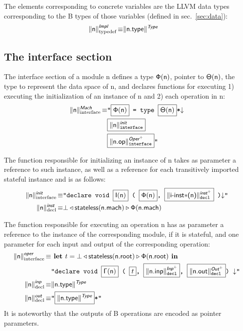 \documentclass{llncs}
\newcommand{\trad}[2]{\ensuremath{\lVert \textsf{#1} \rVert^{\textit{#2}}}}
\newcommand{\nl}[0]{\ensuremath{\downarrow}}
\DeclareMathOperator{\isdef}{\equiv}
\newcommand{\llvm}[1]{\texttt{#1}}
\newcommand{\B}[1]{\textsf{#1}}
\newcommand{\ListOf}[1]{$\mbox{#1}^+$}
\newcommand{\LET}[0]{\textbf{ let }}
\newcommand{\IN}[0]{\textbf{ in }}
\newcommand{\PH}[1]{\framebox{$#1$}}
\newcommand{\Global}[0]{\ensuremath{\sf\Gamma}}
\newcommand{\stateless}[0]{\ensuremath{\textsf{stateless}}}
\newcommand{\trimportedinstances}[0]{\ensuremath{\textsf{i-inst$\mathsf{\ast}$}}}
\newcommand{\state}[0]{\ensuremath{\sf\Theta}}
\newcommand{\stateref}[0]{\ensuremath{\sf\Phi}}
\newcommand{\init}[0]{\ensuremath{\mathsf{I}}}
\begin{document}
The elements corresponding to concrete variables are the LLVM data types
corresponding to the B types of those variables (defined in
sec.~\ref{sec:data}):
\begin{align*}
  \trad{\B{n}}{\B{Impl}}_{\text{typedef}} \isdef
  & \trad{\B{n.type}}{\B{Type}}
\end{align*}

\subsection{The interface section}

The interface section of a module \B{n} defines a type $\stateref(\B{n})$,
pointer to $\state(\B{n})$, the type to represent the data space of \B{n}, and
declares functions for executing 1) executing the initialization of an instance
of \B{n} and 2) each operation in \B{n}:
\begin{align*}
  \trad{\B{n}}{\B{Mach}}_{\text{interface}} \isdef
  & \llvm{"\PH{\stateref(\B{n})} = type \PH{\state(\B{n})}*\nl} \\
  & \llvm{\PH{\trad{\B{n}}{\B{init}}_{\text{interface}}}}\\
  & \llvm{\PH{\trad{\B{n.op}}{\ListOf{\B{Oper}}}_{\text{interface}}}"}
\end{align*}

The function responsible for initializing an instance of \B{n} takes as
parameter a reference to such instance, as well as a reference for each
transitively imported stateful instance and is as follows:
\begin{align*}
  \trad{\B{n}}{\B{init}}_{\text{interface}} \isdef
  & \llvm{"declare void \PH{\init(\B{n})} ( \PH{\stateref(\B{n})},
    \PH{\trad{\trimportedinstances(\B{n})}{\ListOf{\B{inst}}}_{\text{decl}}} )\nl"} \\
  \trad{\B{n}}{\B{inst}}_{\text{decl}} \isdef
  & \bot \triangleleft \stateless(\B{n.mach}) \triangleright \stateref(\B{n.mach})
\end{align*}

The function responsible for executing an operation \B{n} has as parameter a
reference to the instance of the corresponding module, if it is stateful, and
one parameter for each input and output of the corresponding operation:
\begin{align*}
  \trad{\B{n}}{\B{oper}}_{\text{interface}} \isdef
  &
\LET t = \bot \triangleleft \stateless(\B{n.root}) \triangleright \stateref(\B{n.root}) \IN \\
& \llvm{"declare void \PH{\Global(\B{n})}
( \PH{t},
  \PH{\trad{\B{n.inp}}{\ListOf{\B{Inp}}}_{\text{decl}}},
  \PH{\trad{\B{n.out}}{\ListOf{\B{Out}}}_{\text{decl}}}) \nl"} \\
  \trad{\B{n}}{\B{inp}}_{\text{decl}} \isdef & \trad{\B{n.type}}{\B{Type}} \\
  \trad{\B{n}}{\B{out}}_{\text{decl}} \isdef & \llvm{"\PH{\trad{\B{n.type}}{\B{Type}}}*"}
\end{align*}
It is noteworthy that the outputs of B operations are encoded as pointer
parameters.
\end{document}
